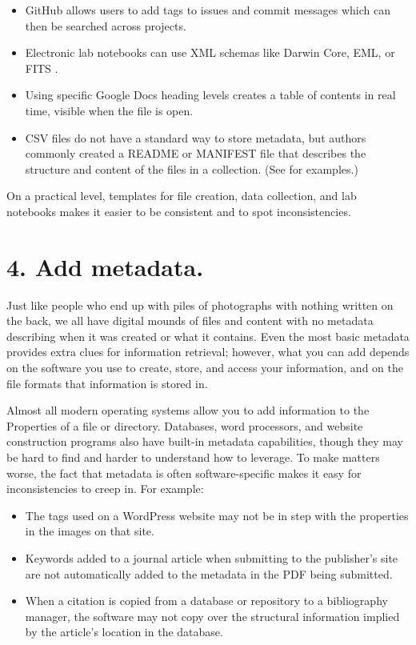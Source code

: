 \documentclass[10pt,letterpaper]{article}
\newcommand{\rulemajor}[1]{\section*{#1}}
\begin{document}
\begin{itemize}

\item
  GitHub allows users to add tags to issues and commit messages which can then
  be searched across projects.

\item
  Electronic lab notebooks can use XML schemas like Darwin Core, EML, or FITS
  \cite{Briney2015}.

\item
  Using specific Google Docs heading levels creates a table of contents in real
  time, visible when the file is open.

\item
  CSV files do not have a standard way to store metadata, but authors commonly
  created a README or MANIFEST file that describes the structure and content of
  the files in a collection. (See \cite{Pudding} for examples.)

\end{itemize}

On a practical level, templates for file creation, data collection, and lab
notebooks makes it easier to be consistent and to spot inconsistencies.

\rulemajor{4. Add metadata.}

Just like people who end up with piles of photographs with nothing written on
the back, we all have digital mounds of files and content with no metadata
describing when it was created or what it contains. Even the most basic metadata
provides extra clues for information retrieval; however, what you can add
depends on the software you use to create, store, and access your information,
and on the file formats that information is stored in.

Almost all modern operating systems allow you to add information to the
Properties of a file or directory. Databases, word processors, and website
construction programs also have built-in metadata capabilities, though they may
be hard to find and harder to understand how to leverage. To make matters worse,
the fact that metadata is often software-specific makes it easy for
inconsistencies to creep in. For example:

\begin{itemize}

\item
  The tags used on a WordPress website may not be in step with the properties in
  the images on that site.

\item
  Keywords added to a journal article when submitting to the publisher's site
  are not automatically added to the metadata in the PDF being submitted.

\item
  When a citation is copied from a database or repository to a bibliography manager,
  the software may not copy over the structural information implied by the
  article's location in the database.

\end{itemize}
\end{document}

